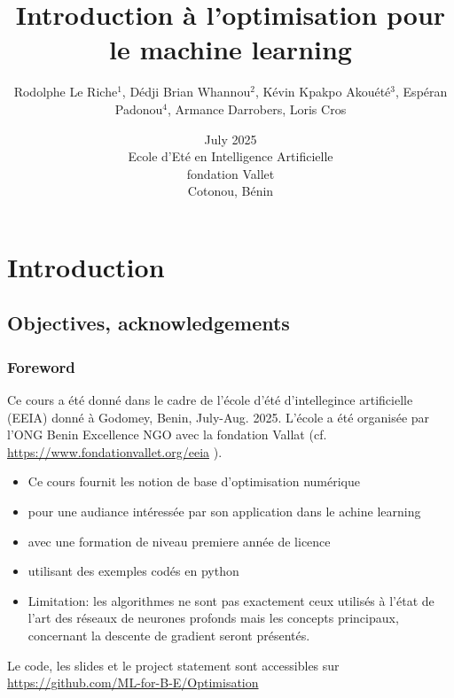 \documentclass[12pt]{beamer}
\begin{document}
\title
[~Optimisation pour le machine learning
]
{Introduction à l'optimisation pour le machine learning}
\author
[Le Riche et al.]
{\normalsize Rodolphe Le Riche$^1$, Dédji Brian Whannou$^2$, Kévin Kpakpo Akouété$^3$, Espéran Padonou$^4$, Armance Darrobers, Loris Cros} 
\date[July 2025]{July 2025 \\
Ecole d'Eté en Intelligence Artificielle \\
fondation Vallet\\
Cotonou, Bénin} 
\begin{frame}
\titlepage
\end{frame}

\section{Introduction}
\subsection{Objectives, acknowledgements}

\begin{frame}
\frametitle{Foreword}
Ce cours a été donné dans le cadre de l'école d'été d'intellegince artificielle (EEIA) donné à Godomey, Benin, July-Aug. 2025.
L'école a été organisée par l'ONG Benin Excellence NGO avec la fondation Vallat (cf. 
{\scriptsize
\url{https://www.fondationvallet.org/eeia}}
).
\begin{itemize}
\item Ce cours fournit les notion de base d'optimisation numérique
\item pour une audiance intéressée par son application dans le achine learning
\item avec une formation de niveau premiere année de licence
\item utilisant des exemples codés en python
\item Limitation: les algorithmes ne sont pas exactement ceux utilisés à l'état de l'art des réseaux de neurones profonds mais les concepts principaux, concernant la descente de gradient seront présentés.
\end{itemize}
Le code, les slides et le project statement sont accessibles sur {\scriptsize \url{https://github.com/ML-for-B-E/Optimisation}}
\end{frame}
\end{document}
